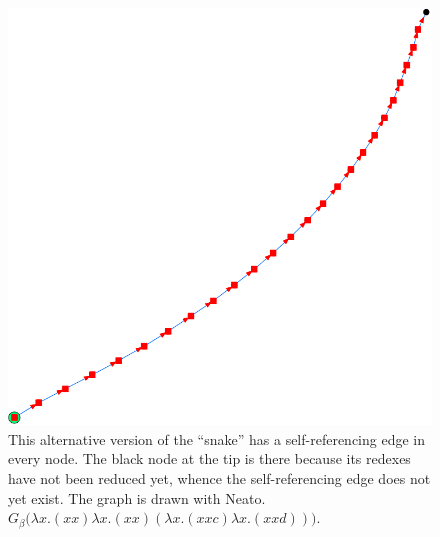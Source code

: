 \begin{figure}[htbp]
	\centering
		\includegraphics[height=\exampleheight]{../images/Snake_1_NEATO.png}
	\caption[$\lambda x.(x x) \lambda x.(x x) (\lambda x.(x x c) \lambda x.(x x d))$]
	{This alternative version of the ``snake'' has a self-referencing edge
	in every node. The black node at the tip is there because its redexes have not been
	reduced yet, whence the self-referencing edge does not yet exist. The graph is drawn
	with Neato.
	$G_\beta\big(\lambda x.(x x) \lambda x.(x x) (\lambda x.(x x c) \lambda x.(x x d))\big)$.}
	\label{fig:images_Snake_1_NEATO}
\end{figure}


